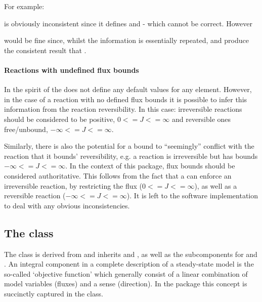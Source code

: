 For example:


is obviously inconsistent since it defines  and  - which cannot be correct. However


would be fine since, whilst the information is essentially repeated,  and  produce the consistent result that .

\paragraph{Reactions with undefined flux bounds}
In the spirit of \sbmlthreecore the \FBCPackage does not define any default values for any element. However, in the case of a reaction with no defined flux bounds it is possible to infer this information from the reaction reversibility. In this case: irreversible reactions should be considered to be positive, $0 <= J <= \infty$ and reversible ones free/unbound, $-\infty <= J <= \infty$.

Similarly, there is also the potential for a bound to ``seemingly'' conflict with the reaction that it bounds' reversibility, e.g. a reaction is irreversible but has bounds $-\infty <= J <= \infty$. In the context of this package, flux bounds should be considered authoritative. This follows from the fact that a \FluxBound can enforce an irreversible reaction, by restricting the flux ($0 <= J <= \infty$), as well as a reversible reaction ($-\infty <= J <= \infty$). It is left to the software implementation to deal with any obvious inconsistencies.

\newpage

\subsection{The \FBC {} class}
\label{objective-class}
\label{listoffluxobjectives-class}

The \FBC \Objective class is derived from \SBML \SBase and inherits
 and , as well as the subcomponents for
\Annotation and \Notes. An integral component in a complete description
of a steady-state model is the so-called `objective function' which generally
consist of a linear combination of model variables (fluxes) and a sense
(direction). In the \FBC package this concept is succinctly captured in the
\Objective class.


